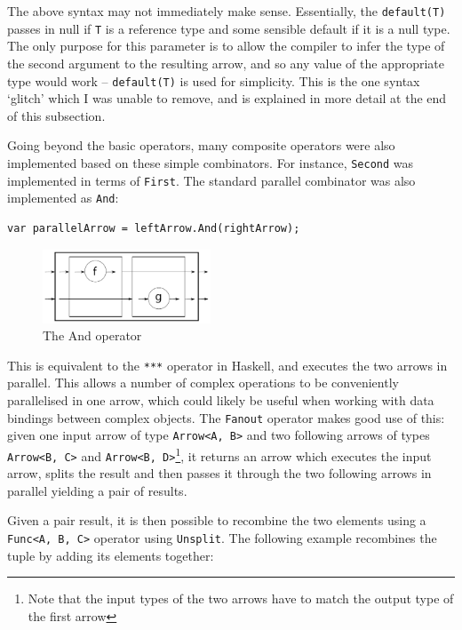 \documentclass[12pt,twoside,notitlepage]{report}
\begin{document}
The above syntax may not immediately make sense. Essentially, the \texttt{default(T)} passes in null if \texttt{T} is a reference type and some sensible default if it is a null type. The only purpose for this parameter is to allow the compiler to infer the type of the second argument to the resulting arrow, and so any value of the appropriate type would work -- \texttt{default(T)} is used for simplicity. This is the one syntax `glitch' which I was unable to remove, and is explained in more detail at the end of this subsection.

Going beyond the basic operators, many composite operators were also implemented based on these simple combinators. For instance, \texttt{Second} was implemented in terms of \texttt{First}. The standard parallel combinator was also implemented as \texttt{And}:

\begin{lstlisting}[language={[Sharp]C}]
var parallelArrow = leftArrow.And(rightArrow);
\end{lstlisting}

\begin{figure}[!ht]
  \centering
  \includegraphics[width=50mm]{fig/AndOperator.pdf}
  \caption{The And operator}
  \label{fig:and_operator}
\end{figure}

This is equivalent to the \texttt{***} operator in Haskell, and executes the two arrows in parallel. This allows a number of complex operations to be conveniently parallelised in one arrow, which could likely be useful when working with data bindings between complex objects. The \texttt{Fanout} operator makes good use of this: given one input arrow of type \texttt{Arrow<A, B>} and two following arrows of types \texttt{Arrow<B, C>} and \texttt{Arrow<B, D>}\footnote{Note that the input types of the two arrows have to match the output type of the first arrow}, it returns an arrow which executes the input arrow, splits the result and then passes it through the two following arrows in parallel yielding a pair of results.

Given a pair result, it is then possible to recombine the two elements using a \texttt{Func<A, B, C>} operator using \texttt{Unsplit}. The following example recombines the tuple by adding its elements together:
\end{document}
